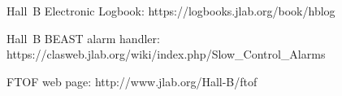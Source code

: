 \documentclass[12pt]{article}
\begin{document}
\clearpage

\vfil
\eject

\begin{thebibliography}{99}

Hall~B Electronic Logbook: https://logbooks.jlab.org/book/hblog

Hall~B BEAST alarm handler: \\
https://clasweb.jlab.org/wiki/index.php/Slow\_Control\_Alarms

FTOF web page: http://www.jlab.org/Hall-B/ftof

\end{thebibliography}
\end{document}
